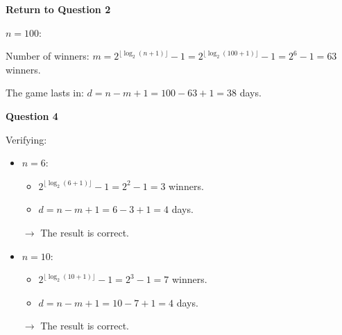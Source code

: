 \documentclass[12pt]{article}
\begin{document}
\textbf{Return to Question 2}

$n=100$: \par
Number of winners: $m=2^{\lfloor \log_2 \left(n+1 \right) \rfloor} -1= 2^{\lfloor\log_2 \left(100+1 \right) \rfloor} -1 = 2^6-1 = 63$ winners. \par
The game lasts in: $d=n-m+1= 100- 63 +1 = 38$ days. \par


\textbf{Question 4}

Verifying: \par
\begin{itemize}
    \item $n=6$:
    \begin{itemize}
        \item $2^{\lfloor\log_2 \left(6+1 \right) \rfloor} -1 = 2^2-1=3$ winners.
        \item $d=n-m+1=6-3+1=4$ days.
    \end{itemize}
    $\longrightarrow$ The result is correct.
    
    \item $n=10$:
    \begin{itemize}
        \item $2^{\lfloor\log_2 \left(10+1 \right) \rfloor} -1 = 2^3-1=7$ winners.
        \item $d=n-m+1=10-7+1=4$ days.
    \end{itemize}
    $\longrightarrow$ The result is correct.
\end{itemize}
\end{document}

